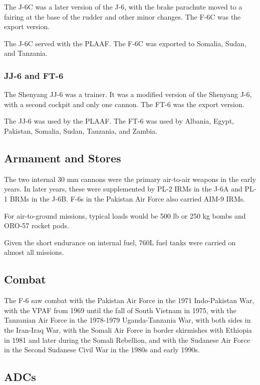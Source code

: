 The J-6C was a later version of the J-6, with the brake parachute moved to a fairing at the base of the rudder and other minor changes. The F-6C was the export version.

The J-6C served with the PLAAF. The F-6C was exported to Somalia, Sudan, and Tanzania.

\subsubsection{JJ-6 and FT-6}

The Shenyang JJ-6 was a trainer. It was a modified version of the Shenyang J-6, with a second cockpit and only one cannon. The FT-6 was the export version.

The JJ-6 was used by the PLAAF. The FT-6 was used by Albania, Egypt, Pakistan, Somalia, Sudan, Tanzania, and Zambia.

\subsection{Armament and Stores}

The two internal 30 mm cannons were the primary air-to-air weapons in the early years. In later years, these were supplemented by PL-2 IRMs in the J-6A and PL-1 BRMs in the J-6B. F-6s in the Pakistan Air Force also carried AIM-9 IRMs.

For air-to-ground missions, typical loads would be 500 lb or 250 kg bombs and ORO-57 rocket pods.

Given the short endurance on internal fuel, 760L fuel tanks were carried on almost all missions.

\subsection{Combat}

The F-6 saw combat with the Pakistan Air Force in the 1971 Indo-Pakistan War, with the VPAF from 1969 until the fall of South Vietnam in 1975, with the Tanzanian Air Force in the 1978-1979 Uganda-Tanzania War, with both sides in the Iran-Iraq War, with the Somali Air Force in border skirmishes with Ethiopia in 1981 and later during the Somali Rebellion, and with the Sudanese Air Force in the Second Sudanese Civil War in the 1980s and early 1990s.

\subsection{ADCs}

